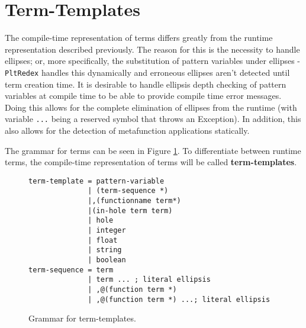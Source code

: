 \section{Term-Templates}
\label{section:term-templates}

The compile-time representation of terms differs greatly from the runtime representation described previously. The reason for this is the necessity to handle ellipses; or, more specifically, the substitution of pattern variables under ellipses - \texttt{PltRedex} handles this dynamically and erroneous ellipses aren't detected until term creation time.
It is desirable to handle ellipsis depth checking of pattern variables at compile time to be able to provide compile time error messages. Doing this allows for the complete elimination of ellipses from the runtime (with variable \texttt{...} being a reserved symbol that throws an Exception). In addition, this also allows for the detection of metafunction applications statically.

The grammar for terms can be seen in Figure \ref{termtemplate-grammar}. To differentiate between runtime terms, the compile-time representation of terms will be called \textbf{term-templates}.

\begin{figure}
\begin{verbatim}
term-template = pattern-variable
              | (term-sequence *)
              |,(functionname term*)
              |(in-hole term term)
              | hole
              | integer
              | float
              | string
              | boolean
term-sequence = term
              | term ... ; literal ellipsis
              | ,@(function term *)
              | ,@(function term *) ...; literal ellipsis
\end{verbatim}
\caption{Grammar for term-templates.}
\label{termtemplate-grammar}
\end{figure}

